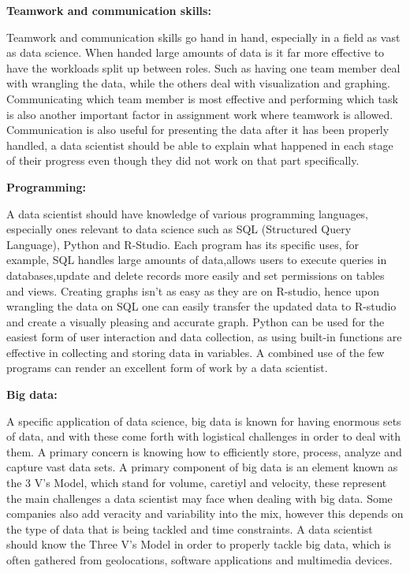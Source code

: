 \documentclass[a4paper, 11pt]{report}
\begin{document}
\bigskip

\textbf{Teamwork and communication skills:}
\par Teamwork and communication skills go hand in hand, especially in a field as vast as data science. When handed large amounts of data is it far more effective to have the workloads split up between roles. Such as having one team member deal with wrangling the data, while the others deal with visualization and graphing.  Communicating which team member is most effective and performing which task is also another important factor in assignment work where teamwork is allowed. Communication is also useful for presenting the data after it has been properly handled, a data scientist should be able to explain what happened in each stage of their progress even though they did not work on that part specifically.

\bigskip

\textbf{Programming:}
\par A data scientist should have knowledge of various programming languages, especially ones relevant to data science such as SQL (Structured Query Language), Python and R-Studio. Each program has its specific uses, for example, SQL handles large amounts of data,allows users to execute queries in databases,update and delete records more easily and set permissions on tables and views. Creating graphs isn't as easy as they are on R-studio, hence upon wrangling the data on SQL one can easily transfer the updated data to R-studio and create a visually pleasing and accurate graph. Python can be used for the easiest form of user interaction and data collection, as using built-in functions are effective in collecting and storing data in variables. A combined use of the few programs can render an excellent form of work by a data scientist.

\bigskip

\textbf{Big data:}
\par A specific application of data science, big data is known for having enormous sets of data, and with these come forth with logistical challenges in order to deal with them. A primary concern is knowing how to efficiently store, process, analyze and capture  vast data sets. A primary component of big data is an element known as the 3 V’s Model, which stand for volume, caretiyl and velocity, these represent the main challenges a data scientist may face when dealing with big data. Some companies also add veracity and variability into the mix, however this depends on the type of data that is being tackled and time constraints. A data scientist should know the Three V’s Model in order to properly tackle big data, which is often gathered from geolocations, software applications and multimedia devices.
\end{document}
